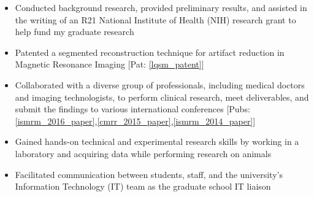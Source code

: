 \begin{minipage}{\textwidth}
	\begin{itemize}
	\item Conducted background research, provided preliminary results, and assisted in the writing of an R21 National Institute of Health (NIH) research grant to help fund my graduate research
   	\item Patented a segmented reconstruction technique for artifact reduction in Magnetic Resonance Imaging [Pat: \ref{lqsm_patent}]
	\item Collaborated with a diverse group of professionals, including medical doctors and imaging technologists, to perform clinical research, meet deliverables, and submit the findings to various international conferences [Pubs: \ref{ismrm_2016_paper},\ref{cmrr_2015_paper},\ref{ismrm_2014_paper}]
	\item Gained hands-on technical and experimental research skills by working in a laboratory and acquiring data while performing research on animals
	\item Facilitated communication between students, staff, and the university's Information Technology (IT) team as the graduate school IT liaison

\end{itemize}
\end{minipage}
